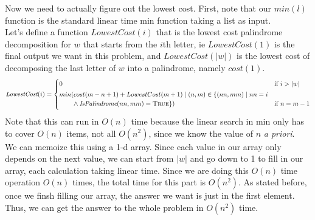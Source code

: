 \documentclass[11pt]{article}
\begin{document}
\begin{solution}
Now we need to actually figure out the lowest cost. First, note that our $min(l)$ function is the standard linear time min function taking a list as input. 
\\ Let's define a function $LowestCost(i)$ that is the lowest cost palindrome decomposition for $w$ that starts from the $i$th letter, ie $LowestCost(1)$ is the final output we want in this problem, and $LowestCost(|w|)$ is the lowest cost of decomposing the last letter of $w$ into a palindrome, namely $cost(1)$.
\[
    \emph{LowestCost}(i) =
	\begin{cases}
		0 & \text{if $i > |w|$}
\\[0.5ex]
        min(cost(m - n + 1) + LowestCost(m + 1) \mid (n, m) \in \{(nn, mm) \mid nn = i 
        \\ \qquad{} \wedge \emph{IsPalindrome}(nn, mm) = \textsc{True}\}) & \text{if $n = m - 1$}
\\[0.5ex]
	\end{cases}
\]
Note that this can run in $O(n)$ time because the linear search in min only has to cover $O(n)$ items, not all $O(n^2)$, since we know the value of $n$ \textit{a priori}.
\\ We can memoize this using a 1-d array. Since each value in our array only depends on the next value, we can start from $|w|$ and go down to 1 to fill in our array, each calculation taking linear time. Since we are doing this $O(n)$ time operation $O(n)$ times, the total time for this part is $O(n^2)$. As stated before, once we finsh filling our array, the answer we want is just in the first element. Thus, we can get the answer to the whole problem in $O(n^2)$ time.
\end{solution}
\end{document}
